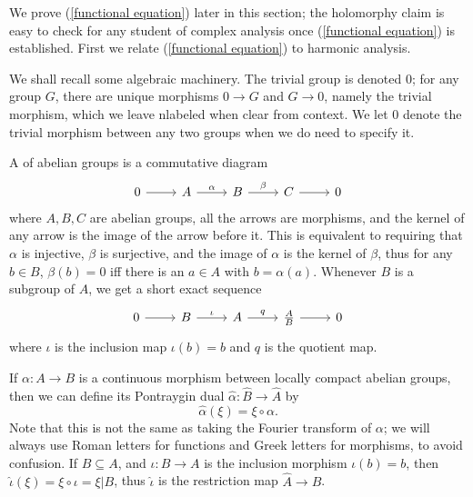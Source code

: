 We prove (\ref{functional equation}) later in this section; the holomorphy claim is easy to check for any student of complex analysis once (\ref{functional equation}) is established.
First we relate (\ref{functional equation}) to harmonic analysis.

We shall recall some algebraic machinery.
The trivial group is denoted $0$; for any group $G$, there are unique morphisms $0 \to G$ and $G \to 0$, namely the trivial morphism, which we leave nlabeled when clear from context.
We let $0$ denote the trivial morphism between any two groups when we do need to specify it.

A  of abelian groups is a commutative diagram
$$\begin{tikzcd}
0 \arrow[r] & A \arrow[r,"\alpha"] & B \arrow[r,"\beta"] & C \arrow[r] & 0
\end{tikzcd}$$
where $A,B,C$ are abelian groups, all the arrows are morphisms, and the kernel of any arrow is the image of the arrow before it.
This is equivalent to requiring that $\alpha$ is injective, $\beta$ is surjective, and the image of $\alpha$ is the kernel of $\beta$, thus for any $b \in B$, $\beta(b) = 0$ iff there is an $a \in A$ with $b = \alpha(a)$.
Whenever $B$ is a subgroup of $A$, we get a short exact sequence
\begin{equation}\label{quotient SES}
\begin{tikzcd}
0 \arrow[r] & B \arrow[r,"\iota"] & A \arrow[r,"q"] & \frac{A}{B} \arrow[r] & 0
\end{tikzcd}
\end{equation}
where $\iota$ is the inclusion map $\iota(b) =b$ and $q$ is the quotient map.

If $\alpha: A \to B$ is a continuous morphism between locally compact abelian groups, then we can define its Pontraygin dual $\hat \alpha: \hat B \to \hat A$ by
\[\hat \alpha(\xi) = \xi \circ \alpha.\]
Note that this is not the same as taking the Fourier transform of $\alpha$; we will always use Roman letters for functions and Greek letters for morphisms, to avoid confusion.
If $B \subseteq A$, and $\iota: B \to A$ is the inclusion morphism $\iota(b) = b$, then $\hat \iota(\xi) = \xi \circ \iota = \xi|B$, thus $\hat \iota$ is the restriction map $\hat A \to \hat B$.

